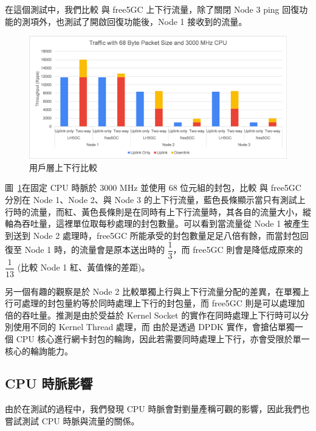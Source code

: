在這個測試中，我們比較 \LHCN 與 free5GC 上下行流量，除了關閉 Node 3 ping 回復功能的測項外，也測試了開啟回復功能後，Node 1 接收到的流量。

\begin{figure}[htb]
    \centering
    \includegraphics[height=!,width=1\linewidth,keepaspectratio=true]{figures/up_uldl_comp}
    \caption[用戶層上下行比較]{{\footnotesize 用戶層上下行比較}}
    \label{fig:up_uldl_comp}
\end{figure}

圖~\ref{fig:up_uldl_comp}在固定 CPU 時脈於 3000 MHz 並使用 68 位元組的封包，比較 \LHCN 與 free5GC 分別在 Node 1、Node 2、與 Node 3 的上下行流量，藍色長條顯示當只有測試上行時的流量，而紅、黃色長條則是在同時有上下行流量時，其各自的流量大小，縱軸為吞吐量，這裡單位取每秒處理的封包數量。可以看到當流量從 Node 1 被產生到送到 Node 2 處理時，free5GC 所能承受的封包數量足足八倍有餘，而當封包回復至 Node 1 時，\LHCN 的流量會是原本送出時的 $\dfrac{1}{3}$，而 free5GC 則會是降低成原來的 $\dfrac{1}{13}$ (比較 Node 1 紅、黃值條的差距)。

另一個有趣的觀察是於 Node 2 比較單獨上行與上下行流量分配的差異，\LHCN 在單獨上行可處理的封包量約等於同時處理上下行的封包量，而 free5GC 則是可以處理加倍的吞吐量。推測是由於受益於 Kernel Socket 的實作在同時處理上下行時可以分別使用不同的 Kernel Thread 處理，而 \LHCN 由於是透過 DPDK 實作，會搶佔單獨一個 CPU 核心進行網卡封包的輪詢，因此若需要同時處理上下行，亦會受限於單一核心的輪詢能力。

\subsection{CPU 時脈影響}
\label{subsec:cpu_clock}

由於在測試的過程中，我們發現 CPU 時脈會對劉量產稱可觀的影響，因此我們也嘗試測試 CPU 時脈與流量的關係。

